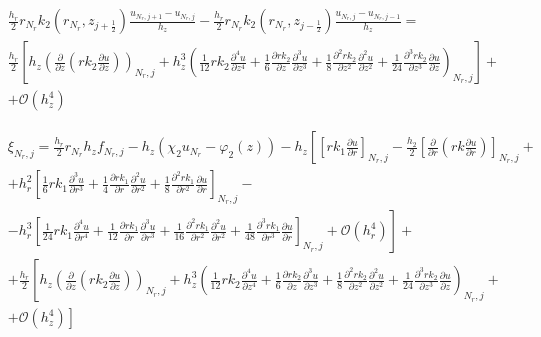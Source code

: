 \begin{align*}
  &\frac{h_r}{2} r_{N_r} k_2(r_{N_r}, z_{j+\frac{1}{2}}) \frac{u_{N_r, j + 1} - u_{N_r, j}}{h_{z}}
  - \frac{h_r}{2} r_{N_r} k_2(r_{N_r}, z_{j-\frac{1}{2}}) \frac{u_{N_r, j} - u_{N_r, j - 1}}{h_z} = \\
  &\frac{h_r}{2} \left[
    h_z \left(\frac{\partial}{\partial z} \left( r k_2 \frac{\partial u}{\partial z} \right) \right)_{N_r, j}
    + h^3_z \left( 
      \frac{1}{12} rk_2 \frac{\partial^4 u}{\partial z^4} +
      \frac{1}{6} \frac{\partial rk_2}{\partial z} \frac{\partial^3 u}{\partial z^3} +
      \frac{1}{8} \frac{\partial^2 rk_2}{\partial z^2} \frac{\partial^2 u}{\partial z^2} +
      \frac{1}{24} \frac{\partial^3 rk_2}{\partial z^3} \frac{\partial u}{\partial z}
    \right)_{N_r, j}
   \right] +\\
   & + \mathcal{O}(h^4_z)
\end{align*}

\begin{align*}
  &\xi_{N_r, j} = \frac{h_r}{2} r_{N_r} h_z f_{N_r, j} - h_z ( \chi_2 u_{N_r} - \varphi_2(z)) -
  h_z\left[
    \left[ rk_1 \frac{\partial u}{\partial r} \right]_{N_r, j} -
    \frac{h_2}{2} \left[ \frac{\partial }{\partial r} \left( rk \frac{\partial u}{\partial r} \right) \right]_{N_r, j} + \right.\\
    & + h^2_r \left[
    \frac{1}{6} rk_1 \frac{\partial^3 u}{\partial r^3} +
    \frac{1}{4} \frac{\partial rk_1}{\partial r} \frac{\partial^2 u}{\partial r^2} +
    \frac{1}{8} \frac{\partial^2 rk_1}{\partial r^2} \frac{\partial u}{\partial r}
   \right]_{N_r, j} -\\
   &\left. -h^3_r \left[ 
    \frac{1}{24} rk_1 \frac{\partial^4 u}{\partial r^4} +
    \frac{1}{12} \frac{\partial rk_1}{\partial r} \frac{\partial^3 u}{\partial r^3} +
    \frac{1}{16} \frac{\partial^2 rk_1}{\partial r^2} \frac{\partial^2 u}{\partial r^2} +
    \frac{1}{48} \frac{\partial^3 rk_1}{\partial r^3} \frac{\partial u}{\partial r}
  \right]_{N_r, j} + \mathcal{O}(h^4_r) \right] + \\
  &+ \frac{h_r}{2} \left[
    h_z \left(\frac{\partial}{\partial z} \left( r k_2 \frac{\partial u}{\partial z} \right) \right)_{N_r, j}
    + h^3_z \left( 
      \frac{1}{12} rk_2 \frac{\partial^4 u}{\partial z^4} +
      \frac{1}{6} \frac{\partial rk_2}{\partial z} \frac{\partial^3 u}{\partial z^3} +
      \frac{1}{8} \frac{\partial^2 rk_2}{\partial z^2} \frac{\partial^2 u}{\partial z^2} +
      \frac{1}{24} \frac{\partial^3 rk_2}{\partial z^3} \frac{\partial u}{\partial z}
    \right)_{N_r, j} +
  \right. \\
  &\left. +  \mathcal{O}(h^4_z) \right]
\end{align*}

